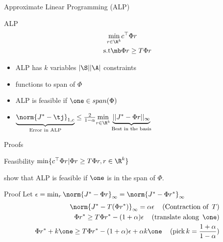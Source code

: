 \documentclass[10pt]{beamer}
\begin{document}
\begin{frame}[fragile]{Approximate Linear Programming (ALP)}
\begin{block}{ALP \cite{schweitzer1985generalized,de2003linear}}
\begin{align*}
\min_{r\in \R^k} &c^\top \Phi r\\
\text{s.t}\mb &\Phi r\geq T \Phi r
\end{align*}
\end{block}

\begin{itemize}
\item ALP has $k$ variables $|\S||\A|$ constraints
\item {\color{orange}{superharmonic}} functions {\color{orange}{restricted}} to span of $\Phi$
\item ALP is feasible if $\one \in span(\Phi)$
\item $\underbrace{\norm{J^*-\tj}_{1,c}}_{\text{Error in ALP}}\leq \frac{2}{1-\alpha}\underset{r\in \R^k}{\min}\underbrace{||J^*-\Phi r||_{\infty}}_{\text{Best in the basis}}$
\end{itemize}
\end{frame}

\begin{comment}
\begin{frame}[fragile]{Saliency of ALP}
\begin{itemize}
\item $\norm{J^*-\tj}_{1,c}$, can choose $c$ to control the error
\item $\underbrace{\norm{J^*-\tj}_{1,c}}_{\text{Error in ALP}}\leq \frac{2}{1-\beta_\psi}\underset{r\in \R^k}{\min}\underbrace{||J^*-\Phi r||_{\infty,\psi}}_{\text{Best in the basis}}$
\item \cite{de2003linear,de2004constraint} choose $\psi$ to be large in un-important parts of state space
\end{itemize}

\end{frame}
\end{comment}

\begin{frame}[fragile]{Proofs}
\begin{block}{Feasibility}
$\min\{ c^\top \Phi r | \Phi r\geq T \Phi r, r\in \R^k\}$
\end{block}
\cite{de2003linear} show that ALP is feasible if $\one$ is in the span of $\Phi$.
\begin{block}{Proof}
Let $\epsilon=\min_r \norm{J^*-\Phi r}_\infty=\norm{J^*-\Phi r^*}_\infty$
\begin{align*}
\norm{J^*-T (\Phi r^*)}_\infty=\alpha \epsilon\,\quad(\text{Contraction~of~}\,T)\\
\Phi r^* \geq T \Phi r^* -(1+\alpha)\epsilon\,\quad(\text{translate~along~}\,\one)\\
\Phi r^* + k\one\geq T \Phi r^* -(1+\alpha)\epsilon +\alpha k\one\,\quad(\text{pick}\,k=\frac{1+\alpha}{1-\alpha})\\
\end{align*}
\end{block}
\end{frame}
\end{document}
